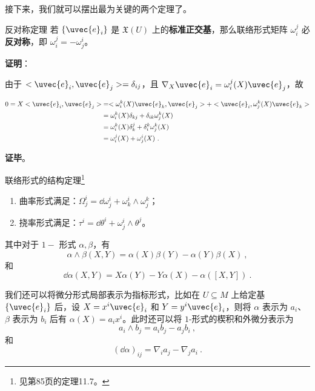 接下来，我们就可以摆出最为关键的两个定理了。

\begin{theorem}{反对称定理}\label{the_ConFom_1}
若 $\{\uvec{e}_i\}$ 是 $\mathfrak{X}(U)$ 上的\textbf{标准正交基}，那么联络形式矩阵 $\omega^j_i$ 必\textbf{反对称}，即 $\omega^j_i=-\omega^i_j$。
\end{theorem}

\textbf{证明}：

由于 $<\uvec{e}_i, \uvec{e}_j>=\delta_{ij}$，且 $\nabla_X\uvec{e}_i=\omega^j_i(X)\uvec{e}_j$，故

\begin{equation}
\begin{aligned}
0=X<\uvec{e}_i, \uvec{e}_j>&=<\omega^k_i(X)\uvec{e}_k, \uvec{e}_j>+<\uvec{e}_i, \omega^k_j(X)\uvec{e}_k>\\
&=\omega^k_i(X)\delta_{kj}+\delta_{ik}\omega^k_j(X)\\
&=\omega^k_i(X)\delta_{k}^j+\delta_{i}^k\omega^k_j(X)\\
&=\omega^j_i(X)+\omega^i_j(X)~.
\end{aligned}
\end{equation}

\textbf{证毕}。



\begin{theorem}{联络形式的结构定理\footnote{见\cite{GTM275}第85页的定理11.7。}}\label{the_ConFom_2}
\begin{enumerate}
\item 曲率形式满足：$\Omega^i_j=\dd \omega^i_j+\omega^i_k\wedge\omega^k_j$；
\item 挠率形式满足：$\tau^i=\dd\theta^i+\omega^i_j\wedge\theta^j$。
\end{enumerate}

其中对于 $1-$ 形式 $\alpha, \beta$，有
\begin{equation}
\alpha\wedge \beta(X, Y)=\alpha(X)\beta(Y)-\alpha(Y)\beta(X)~,
\end{equation}
和
\begin{equation}
\dd \alpha(X, Y)=X\alpha(Y)-Y\alpha(X)-\alpha([X, Y])~.
\end{equation}

我们还可以将微分形式局部表示为指标形式，比如在 $U\subseteq M$ 上给定基 $\{\uvec{e}_i\}$ 后，设 $X=x^i\uvec{e}_i$ 和 $Y=y^i\uvec{e}_i$，则将 $\alpha$ 表示为 $a_i$、$\beta$ 表示为 $b_i$ 后有 $\alpha(X)=a_ix^i$。此时还可以将 $1$-形式的楔积和外微分表示为
\begin{equation}
a_i\wedge b_j=a_ib_j-a_jb_i~,
\end{equation}
和
\begin{equation}
(\dd \alpha)_{ij}=\nabla_{i}a_j-\nabla_{j}a_i~.
\end{equation}
\end{theorem}












